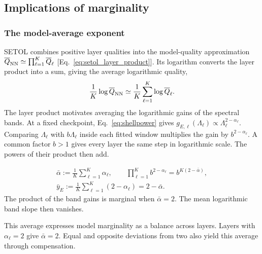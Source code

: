 % 
\clearpage
\subsection{Implications of marginality}
\label{sxn:implications_marginality}

\subsubsection{The model-average exponent}
\label{sxn:model_average_marginality}
SETOL combines positive layer qualities into the model-quality approximation
$\overline Q_{\rm NN}\simeq\prod_{\ell=1}^K\overline Q_\ell$
[Eq.~\eqref{eq:setol_layer_product}]. Its logarithm converts the
layer product into a sum, giving the average logarithmic quality,
\[
 \frac{1}{K}\log\overline Q_{\rm NN}
 \simeq\frac{1}{K}\sum_{\ell=1}^K\log\overline Q_\ell .
\]
The layer product motivates averaging the logarithmic gains of
the spectral bands. At a fixed checkpoint, Eq.~\eqref{eq:shellpower} gives
$g_{E,\ell}(\Lambda_\ell)\propto\Lambda_\ell^{2-\alpha_\ell}$.
Comparing $\Lambda_\ell$ with $b\Lambda_\ell$ inside each fitted window
multiplies the gain by $b^{2-\alpha_\ell}$. A common factor
$b>1$ gives every layer the same step in logarithmic scale.
The powers of their product then add.

\begin{tcolorbox}[marginalbox,title=Marginality on average]
\[
\begin{gathered}
 \bar\alpha:=\frac{1}{K}\sum_{\ell=1}^K\alpha_\ell,\qquad
 \prod_{\ell=1}^K b^{2-\alpha_\ell}=b^{K(2-\bar\alpha)},\\[3pt]
 \bar y_E:=\frac{1}{K}\sum_{\ell=1}^K(2-\alpha_\ell)
          =2-\bar\alpha .
\end{gathered}
\]
\textcolor{boxblue}{The product of the band gains is marginal
when $\bar\alpha=2$. The mean logarithmic band slope then vanishes.}
\end{tcolorbox}

This average expresses model marginality as a balance across layers.
Layers with $\alpha_\ell=2$ give $\bar\alpha=2$. Equal and opposite
deviations from two also yield this average through compensation.

